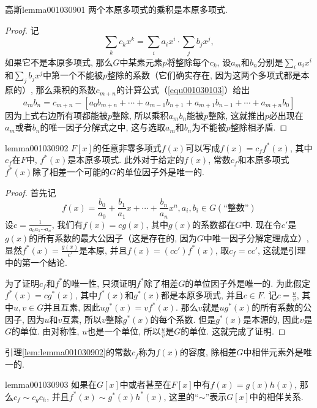 \begin{lemma}{高斯}{lemma001030901}
两个本原多项式的乘积是本原多项式. 
\end{lemma}

\begin{proof}
记
\[
\sum_{k}{c_kx^k} = \sum_{i}{a_ix^i} \cdot \sum_{j}{b_jx^j},
\]
如果它不是本原多项式, 那么$G$中某素元素$p$将整除每个$c_k$, 设$a_m$和$b_n$分别是$\sum_{i}{a_ix^i}$和$\sum_{j}{b_jx^j}$中第一个不能被$p$整除的系数（它们确实存在, 因为这两个多项式都是本原的）, 那么乘积的系数$c_{m+n}$的计算公式（\ref{equ001030103}）给出
\[
a_mb_n=c_{m+n} - [a_0b_{m+n} + \cdots+a_{m-1}b_{n+1} + a_{m+1}b_{n-1} + \cdots+a_{m+n}b_0]
\]
因为上式右边所有项都能被$p$整除, 所以乘积$a_mb_n$能被$p$整除, 这就推出$p$必出现在$a_m$或者$b_n$的唯一因子分解式之中, 这与选取$a_m$和$b_n$为不能被$p$整除相矛盾. 
\end{proof}

\begin{lemma}{}{lemma001030902}
$F[x]$的任意非零多项式$f(x)$可以写成$f(x)=c_ff^*(x)$, 其中$c_f$在$F$中, $f^*(x)$是本原多项式. 此外对于给定的$f(x)$, 常数$c_f$和本原多项式$f^*(x)$除了相差一个可能的$G$的单位因子外是唯一的. 
\end{lemma}

\begin{proof}
首先记
\[
f(x)=\frac{b_0}{a_0} + \frac{b_1}{a_1}x + \cdots + \frac{b_n}{a_n}x^n, a_i, b_i \in G(\text{“整数”})
\]
设$c = \frac{1}{a_0a_1\cdots{}a_n}$, 我们有$f(x)=cg(x)$, 其中$g(x)$的系数都在$G$中. 现在令$c'$是$g(x)$的所有系数的最大公因子（这是存在的, 因为$G$中唯一因子分解定理成立）, 显然$f^*(x)=\frac{g(x)}{c'}$是本原, 并且$f(x)=(cc')f^*(x)$, 取$c_f=cc'$, 这就是引理中的第一个结论. 

为了证明$c_f$和$f^*$的唯一性, 只须证明$f^*$除了相差$G$的单位因子外是唯一的. 为此假定$f^*(x)=cg^*(x)$, 其中$f^*(x)$和$g^*(x)$都是本原多项式, 并且$c \in F$. 记$c = \frac{u}{v}$, 其中$u, v \in G$并且互素, 因此$ug^*(x)=vf^*(x)$. 那么$v$就是$ug^*(x)$的所有系数的公因子, 因为$u$和$v$互素, 所以$v$整除$g^*(x)$的每个系数. 但是$g^*(x)$是本源的, 因此$v$是$G$的单位. 由对称性, $u$也是一个单位, 所以$\frac{u}{v}$是$G$的单位. 这就完成了证明. 
\end{proof}

引理\ref{lem:lemma001030902}的常数$c_f$称为$f(x)$的容度, 除相差$G$中相伴元素外是唯一的. 

\begin{lemma}{}{lemma001030903}
如果在$G[x]$中或者甚至在$F[x]$中有$f(x)=g(x)h(x)$, 那么$c_f \sim c_gc_h$, 并且$f^*(x) \sim g^*(x)h^*(x)$, 这里的“$\sim$”表示$G[x]$中的相伴关系. 
\end{lemma}

